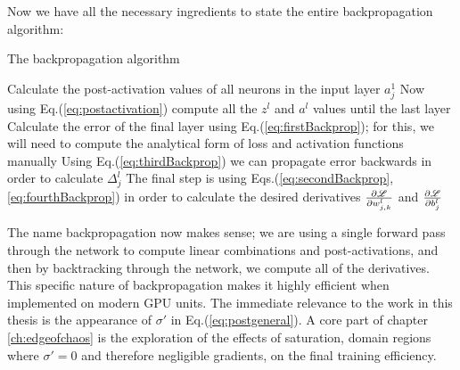 Now we have all the necessary ingredients to state the entire backpropagation algorithm:
\begin{algorithm}[H]
	\caption{The backpropagation algorithm}
	\begin{algorithmic}[1]
		\State Calculate the post-activation values of all neurons in the input layer $a_j^1$
		\State Now using Eq.(\ref{eq:postactivation}) compute all the $z^l$ and $a^l$ values until the last layer
		\State Calculate the error of the final layer using Eq.(\ref{eq:firstBackprop}); for this, we will need to compute the analytical form of loss and activation functions manually
		\State Using Eq.(\ref{eq:thirdBackprop}) we can propagate error backwards in order to calculate $\Delta_j^l$
		\State The final step is using Eqs.(\ref{eq:secondBackprop}, \ref{eq:fourthBackprop}) in order to calculate the desired derivatives $\pdv{\mathcal{L}}{w_{j,k}^{l}}$ and $\pdv{\mathcal{L}}{b_j^l}$
	\end{algorithmic}
\end{algorithm}
The name backpropagation now makes sense; we are using a single forward pass through the network to compute linear combinations and post-activations, and then by backtracking through the network, we compute all of the derivatives. This specific nature of backpropagation makes it highly efficient when implemented on modern GPU units. The immediate relevance to the work in this thesis is the appearance of $\sigma'$ in Eq.(\ref{eq:postgeneral}). A core part of chapter \ref{ch:edgeofchaos} is the exploration of the effects of saturation, domain regions where $\sigma'=0$ and therefore negligible gradients, on the final training efficiency.
